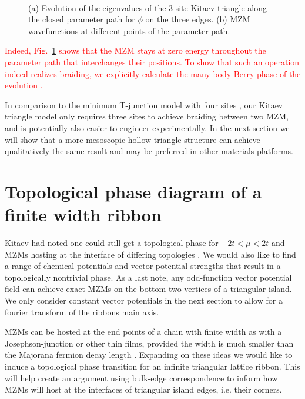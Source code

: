 \documentclass[aps,prb,showpacs,amsmath,twocolumn,amssymb,superscriptaddress]{revtex4-2}
\newcommand{\Red}[1]{\textcolor{red}{#1}}
\begin{document}
\begin{figure}[ht]
	\centering
	\\
	\caption{(a) Evolution of the eigenvalues of the 3-site Kitaev triangle along the closed parameter path for $\phi$ on the three edges. (b) MZM wavefunctions at different points of the parameter path.} 
	\label{fig:3eig}
\end{figure}

\Red{Indeed, Fig.~\ref{fig:3eig} shows that the MZM stays at zero energy throughout the parameter path that interchanges their positions. To show that such an operation indeed realizes braiding, we explicitly calculate the many-body Berry phase of the evolution \cite{aliceaNonAbelianStatisticsTopological2011,Li_2016}.}


In comparison to the minimum T-junction model with four sites \cite{aliceaNonAbelianStatisticsTopological2011}, our Kitaev triangle model only requires three sites to achieve braiding between two MZM, and is potentially also easier to engineer experimentally. In the next section we will show that a more mesoscopic hollow-triangle structure can achieve qualitatively the same result and may be preferred in other materials platforms.

\section{Topological phase diagram of a finite width ribbon}

Kitaev had noted one could still get a topological phase for $-2t<\mu<2t$ and MZMs hosting at the interface of differing topologies \cite{kitaevUnpairedMajoranaFermions2001}.
We would also like to find a range of chemical potentials and vector potential strengths that result in a topologically nontrivial phase.
As a last note, any odd-function vector potential field can achieve exact MZMs on the bottom two vertices of a triangular island.
We only consider constant vector potentials in the next section to allow for a fourier transform of the ribbons main axis.


MZMs can be hosted at the end points of a chain with finite width as with a Josephson-junction or other thin films, provided the width is much smaller than the Majorana fermion decay length \cite{black-schafferMajoranaFermionsSpinorbitcoupled2011, pientkaSignaturesTopologicalPhase2013, hellTwoDimensionalPlatformNetworks2017, scharfTuningTopologicalSuperconductivity2019, potterMultichannelGeneralizationKitaev2010}.
Expanding on these ideas we would like to induce a topological phase transition for an infinite triangular lattice ribbon.
This will help create an argument using bulk-edge correspondence to inform how MZMs will host at the interfaces of triangular island edges, i.e. their corners.
\end{document}
